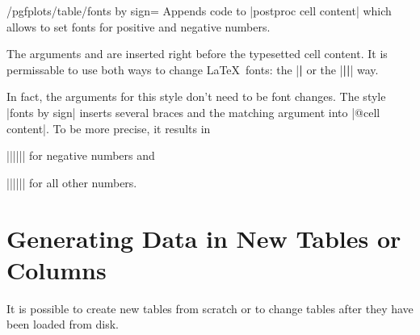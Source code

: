 \begin{stylekey}{/pgfplots/table/fonts by sign=}
	Appends code to |postproc cell content| which allows to set fonts for positive and negative numbers.

	The arguments  and  are inserted right before the typesetted cell content. It is permissable to use both ways to change \LaTeX\ fonts: the |\textbf| or the |{\bfseries ||}| way.

\begin{codeexample}[]

%

\end{codeexample}
	In fact, the arguments for this style don't need to be font changes. The style |fonts by sign| inserts several braces and the matching argument into |@cell content|. To be more precise, it results in

	|{||{||}}| for negative numbers and

	|{||{||}}| for all other numbers.
\end{stylekey}

\section{Generating Data in New Tables or Columns}
\label{pgfplotstable:createcol}
It is possible to create new tables from scratch or to change tables after they have been loaded from disk.

